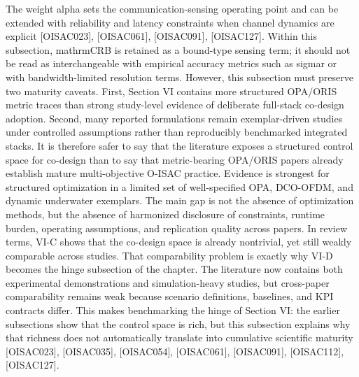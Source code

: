{}The weight \markdownRendererDollarSign{}\markdownRendererBackslash{}alpha\markdownRendererDollarSign{} sets the communication-sensing operating point and can be extended with reliability and latency constraints when channel dynamics are explicit [O\markdownRendererUnderscore{}ISAC\markdownRendererUnderscore{}023], [O\markdownRendererUnderscore{}ISAC\markdownRendererUnderscore{}061], [O\markdownRendererUnderscore{}ISAC\markdownRendererUnderscore{}091], [O\markdownRendererUnderscore{}ISAC\markdownRendererUnderscore{}127]. Within this subsection, \markdownRendererDollarSign{}\markdownRendererBackslash{}mathrm\markdownRendererLeftBrace{}CRB\markdownRendererRightBrace{}\markdownRendererDollarSign{} is retained as a bound-type sensing term; it should not be read as interchangeable with empirical accuracy metrics such as \markdownRendererDollarSign{}\markdownRendererBackslash{}sigma\markdownRendererUnderscore{}r\markdownRendererDollarSign{} or with bandwidth-limited resolution terms. However, this subsection must preserve two maturity caveats. First, Section VI contains more structured OPA/ORIS metric traces than strong study-level evidence of deliberate full-stack co-design adoption. Second, many reported formulations remain exemplar-driven studies under controlled assumptions rather than reproducibly benchmarked integrated stacks. It is therefore safer to say that the literature exposes a structured control space for co-design than to say that metric-bearing OPA/ORIS papers already establish mature multi-objective O-ISAC practice.\markdownRendererParagraphSeparator
{} Evidence is strongest for structured optimization in a limited set of well-specified OPA, DCO-OFDM, and dynamic underwater exemplars. The main gap is not the absence of optimization methods, but the absence of harmonized disclosure of constraints, runtime burden, operating assumptions, and replication quality across papers. In review terms, VI-C shows that the co-design space is already nontrivial, yet still weakly comparable across studies. That comparability problem is exactly why VI-D becomes the hinge subsection of the chapter.\markdownRendererInterblockSeparator
{}
\markdownRendererSectionEnd \markdownRendererSectionBegin
{}\markdownRendererInterblockSeparator
{}The literature now contains both experimental demonstrations and simulation-heavy studies, but cross-paper comparability remains weak because scenario definitions, baselines, and KPI contracts differ. This makes benchmarking the hinge of Section VI: the earlier subsections show that the control space is rich, but this subsection explains why that richness does not automatically translate into cumulative scientific maturity [O\markdownRendererUnderscore{}ISAC\markdownRendererUnderscore{}023], [O\markdownRendererUnderscore{}ISAC\markdownRendererUnderscore{}035], [O\markdownRendererUnderscore{}ISAC\markdownRendererUnderscore{}054], [O\markdownRendererUnderscore{}ISAC\markdownRendererUnderscore{}061], [O\markdownRendererUnderscore{}ISAC\markdownRendererUnderscore{}091], [O\markdownRendererUnderscore{}ISAC\markdownRendererUnderscore{}112], [O\markdownRendererUnderscore{}ISAC\markdownRendererUnderscore{}127].\markdownRendererParagraphSeparator
